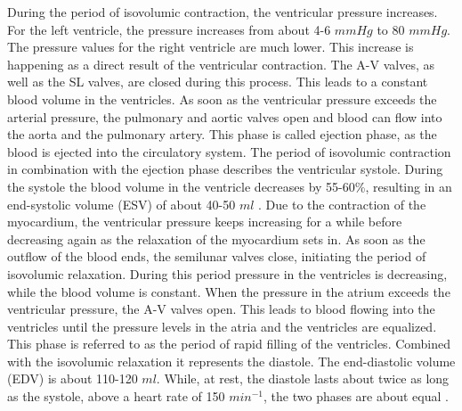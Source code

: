 During the period of isovolumic contraction, the ventricular pressure increases. For the left ventricle, the pressure increases from about 4-6 $mmHg$ to 80 $mmHg$. The pressure values for the right ventricle are much lower. This increase is happening as a direct result of the ventricular contraction. The A-V valves, as well as the SL valves, are closed during this process. This leads to a constant blood volume in the ventricles. As soon as the ventricular pressure exceeds the arterial pressure, the pulmonary and aortic valves open and blood can flow into the aorta and the pulmonary artery. This phase is called ejection phase, as the blood is ejected into the circulatory system. The period of isovolumic contraction in combination with the ejection phase describes the ventricular systole. \cite{HKS4} During the systole the blood volume in the ventricle decreases by 55-60\%, resulting in an end-systolic volume (ESV) of about 40-50 $ml$ \cite{GH20}. Due to the contraction of the myocardium, the ventricular pressure keeps increasing for a while before decreasing again as the relaxation of the myocardium sets in. As soon as the outflow of the blood ends, the semilunar valves close, initiating the period of isovolumic relaxation. During this period pressure in the ventricles is decreasing, while the blood volume is constant. When the pressure in the atrium exceeds the ventricular pressure, the A-V valves open. This leads to blood flowing into the ventricles until the pressure levels in the atria and the ventricles are equalized. \cite{HKS4} This phase is referred to as the period of rapid filling of the ventricles. Combined with the isovolumic relaxation it represents the diastole. The end-diastolic volume (EDV) is about 110-120 $ml$. \cite{GH20} While, at rest, the diastole lasts about twice as long as the systole, above a heart rate of 150 $min^{-1}$, the two phases are about equal \cite{HKS4}.


